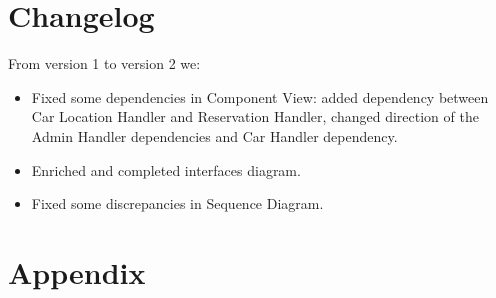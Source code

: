 \documentclass[12pt, a4paper]{article}
\begin{document}
	\section{Changelog}
	From version 1 to version 2 we:
		\begin{itemize}
			\item Fixed some dependencies in Component View: added dependency between Car Location Handler and Reservation Handler, changed direction of the Admin Handler dependencies and Car Handler dependency.
			\item Enriched and completed interfaces diagram.
			\item Fixed some discrepancies in Sequence Diagram.
		\end{itemize}			
	
	\newpage
	\section{Appendix}
	\listoffigures
\end{document}
